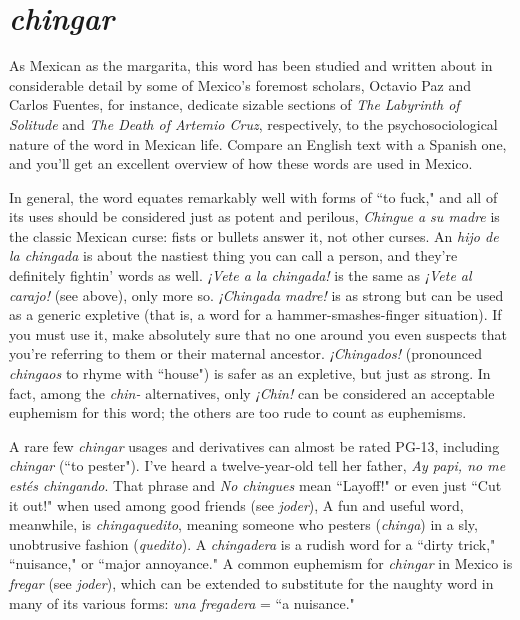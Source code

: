 \section{\emph{chingar}}

As Mexican as the margarita, this word has been studied and
written about in considerable detail by some of Mexico's foremost
scholars, Octavio Paz and Carlos Fuentes, for instance, dedicate sizable
sections of \emph{The Labyrinth of Solitude} and \emph{The Death of Artemio Cruz},
respectively, to the psychosociological nature of the word in Mexican
life. Compare an English text with a Spanish one, and you'll get an excellent overview of how these words are used in Mexico.

In general, the word equates remarkably well with forms of ``to
fuck," and all of its uses should be considered just as potent and perilous, \emph{Chingue a su madre} is the classic Mexican curse: fists or bullets
answer it, not other curses. An \emph{hijo de la chingada} is about the nastiest thing you can call a person, and they're definitely fightin' words as
well. \emph{¡Vete a la chingada!} is the same as \emph{¡Vete al carajo!} (see above),
only more so. \emph{¡Chingada madre!} is as strong but can be used as a generic expletive (that is, a word for a hammer-smashes-finger situation).
If you must use it, make absolutely sure that no one around you even
suspects that you're referring to them or their maternal ancestor. \emph{¡Chingados!} (pronounced \emph{chingaos} to rhyme with ``house") is safer as an expletive, but just as strong. In fact, among the \emph{chin-} alternatives, only
\emph{¡Chin!} can be considered an acceptable euphemism for this word; the
others are too rude to count as euphemisms.

A rare few \emph{chingar} usages and derivatives can almost be rated
PG-13, including \emph{chingar} (``to pester"). I've heard a twelve-year-old tell
her father, \emph{Ay papi, no me estés chingando}. That phrase and \emph{No chingues} mean ``Layoff!" or even just ``Cut it out!" when used among good
friends (see \emph{joder}), A fun and useful word, meanwhile, is \emph{chingaquedito}, meaning someone who pesters (\emph{chinga}) in a sly, unobtrusive fashion (\emph{quedito}). A \emph{chingadera} is a rudish word for a ``dirty trick," ``nuisance," or ``major annoyance." A common euphemism for \emph{chingar} in
Mexico is \emph{fregar} (see \emph{joder}), which can be extended to substitute for
the naughty word in many of its various forms: \emph{una fregadera} = ``a
nuisance."

